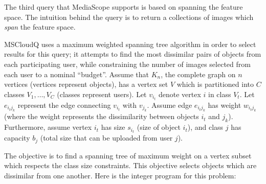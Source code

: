 \ifdefined\notdef
{}
%
The third query that MediaScope supports is based on spanning the
feature space.
%
The intuition behind the query is to return a collections of images
which \emph{span} the feature space.


MSCloudQ uses a maximum weighted spanning tree algorithm in order to
select results for this query; it attempts to find the most dissimilar
pairs of objects from each participating user, while constraining the
number of images selected from each user to a nominal ``budget''.
%
Assume that $K_n$, the complete graph on $n$ vertices (vertices
represent objects), has a vertex set $V$ which is partitioned into $C$
classes $V_{1},\ldots,V_{C}$ (classes represent users).
%
Let $v_{i_t}$ denote vertex $i$ in class $V_t$.
%
Let $e_{i_t j_k}$ represent the edge connecting $v_{i_t}$ with
$v_{j_k}$.
%
Assume edge $e_{i_tj_k}$ has weight $w_{i_tj_k}$ (where the weight
represents the dissimilarity between objects $i_t$ and $j_k$).
%
Furthermore, assume vertex $i_t$ has size $s_{i_t}$ (size of object
$i_t$), and class $j$ has capacity $b_j$ (total size that can be
uploaded from user $j$).
%

The objective is to find a spanning tree of maximum weight on a vertex
subset which respects the class size constraints.
This objective selects objects which are dissimilar from one
another.
%
Here is the integer program for this problem:

